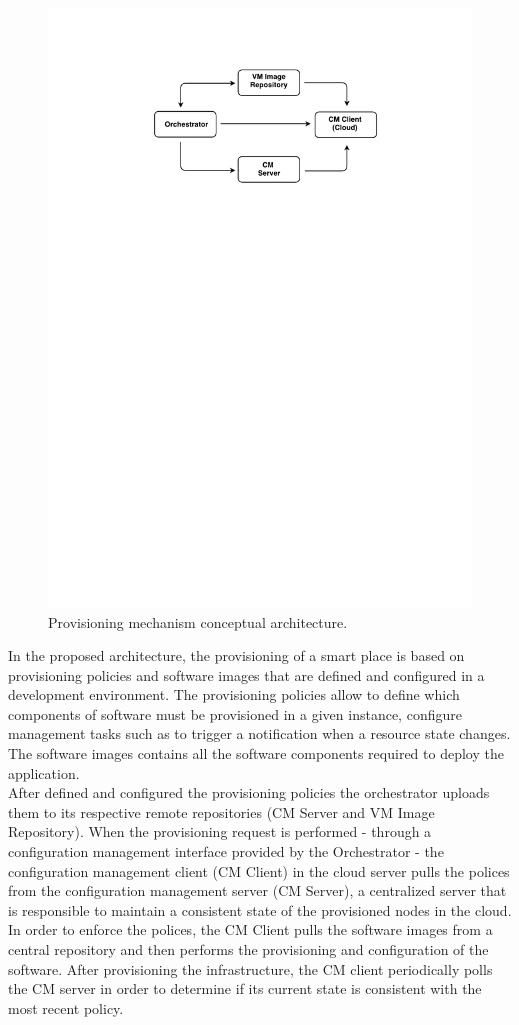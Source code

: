 \begin{figure}[ht!]
  \centering
  \includegraphics[width=.7\textwidth]{images/c4t-generic-solution.pdf}
  \caption[Provisioning mechanism conceptual architecture.]{Provisioning mechanism conceptual architecture.}
  \label{fig:provisioning_generic_architecture}
\end{figure}

In the proposed architecture, the provisioning of a smart place is based on provisioning policies and
software images that are defined and configured in a development environment. The provisioning policies
allow to define which components of software must be provisioned in a given instance, configure
management tasks such as to trigger a notification when a resource state changes. The software images
contains all the software components required to deploy the application.\\

After defined and configured the provisioning policies the orchestrator uploads them to its respective
remote repositories (CM Server and VM Image Repository). When the provisioning request is performed -
through a configuration management interface provided by the Orchestrator - the configuration management
client (\gls{CM} Client) in the cloud server pulls the polices from the configuration management server
(\gls{CM} Server), a centralized server that is responsible to maintain a consistent state of the
provisioned nodes in the cloud. In order to enforce the polices, the \gls{CM} Client pulls the software
images from a central repository and then performs the provisioning and configuration of the software.
After provisioning the infrastructure, the CM client periodically polls the CM server in order to
determine if its current state is consistent with the most recent policy.


